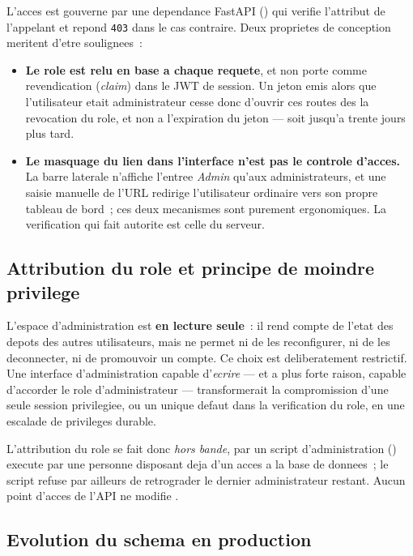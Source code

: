\documentclass[a4paper,12pt,oneside]{report}
\begin{document}
L'acces est gouverne par une dependance FastAPI () qui verifie l'attribut  de l'appelant et repond \texttt{403} dans le cas contraire. Deux proprietes de conception meritent d'etre soulignees~:

\begin{itemize}
  \item \textbf{Le role est relu en base a chaque requete}, et non porte comme revendication (\emph{claim}) dans le JWT de session. Un jeton emis alors que l'utilisateur etait administrateur cesse donc d'ouvrir ces routes des la revocation du role, et non a l'expiration du jeton --- soit jusqu'a trente jours plus tard.
  \item \textbf{Le masquage du lien dans l'interface n'est pas le controle d'acces.} La barre laterale n'affiche l'entree \emph{Admin} qu'aux administrateurs, et une saisie manuelle de l'URL  redirige l'utilisateur ordinaire vers son propre tableau de bord~; ces deux mecanismes sont purement ergonomiques. La verification qui fait autorite est celle du serveur.
\end{itemize}

\subsection{Attribution du role et principe de moindre privilege}

L'espace d'administration est \textbf{en lecture seule}~: il rend compte de l'etat des depots des autres utilisateurs, mais ne permet ni de les reconfigurer, ni de les deconnecter, ni de promouvoir un compte. Ce choix est deliberatement restrictif. Une interface d'administration capable d'\emph{ecrire} --- et a plus forte raison, capable d'accorder le role d'administrateur --- transformerait la compromission d'une seule session privilegiee, ou un unique defaut dans la verification du role, en une escalade de privileges durable.

L'attribution du role se fait donc \emph{hors bande}, par un script d'administration () execute par une personne disposant deja d'un acces a la base de donnees~; le script refuse par ailleurs de retrograder le dernier administrateur restant. Aucun point d'acces de l'API ne modifie .

\subsection{Evolution du schema en production}
\end{document}
